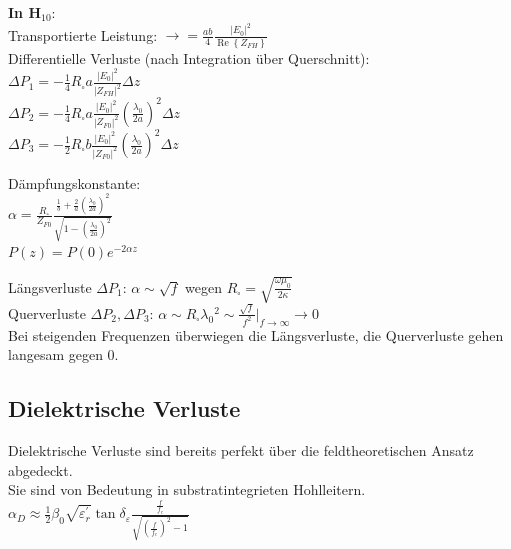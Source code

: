 \documentclass[english]{latex4ei/latex4ei_sheet}
\begin{document}
\begin{sectionbox}
	\textbf{In H$_{10}$}:\\
	Transportierte Leistung: $\rightarrow = \frac{a b}{4} \frac{\left|E_{0}\right|^{2}}{\operatorname{Re}\left\{Z_{F H}\right\}}$\\
	Differentielle Verluste (nach Integration über Querschnitt):\\
	$\Delta P_{1}=-\frac{1}{4} R_{\square} a \frac{\left|E_{0}\right|^{2}}{\left|Z_{F H}\right|^{2}} \Delta z$\\
	$\Delta P_{2}=-\frac{1}{4} R_{\square} a \frac{\left|E_{0}\right|^{2}}{\left|Z_{F 0}\right|^{2}}\left(\frac{\lambda_{0}}{2 a}\right)^{2} \Delta z$ \\
	$\Delta P_{3}=-\frac{1}{2} R_{\square} b \frac{\left|E_{0}\right|^{2}}{\left|Z_{F 0}\right|^{2}}\left(\frac{\lambda_{0}}{2 a}\right)^{2} \Delta z$\\
	\begin{emphbox}
		Dämpfungskonstante:\\
		$\alpha=\frac{R_{\square}}{Z_{F 0}} \frac{\frac{1}{b}+\frac{2}{a}\left(\frac{\lambda_{0}}{2 a}\right)^{2}}{\sqrt{1-\left(\frac{\lambda_{0}}{2 a}\right)^{2}}}$\\ 
		$P(z) = P(0) e^{-2\alpha z}$ 
	\end{emphbox}

	Längsverluste $\Delta P_{1}$: $\alpha \sim \sqrt{f}$ wegen $R_{\square}=\sqrt{\frac{\omega \mu_{0}}{2 \kappa}}$\\ 
	Querverluste $\Delta P_{2}, \Delta P_{3}$: $\alpha \sim R_{\square} \lambda_{0}{ }^{2} \sim \frac{\sqrt{f}}{f^{2}}|_{f \rightarrow \infty} \rightarrow 0$\\ 
	Bei steigenden Frequenzen überwiegen die Längsverluste, die Querverluste gehen langesam gegen 0.

\end{sectionbox}

\begin{sectionbox}
	\subsection{Dielektrische Verluste}
	Dielektrische Verluste sind bereits perfekt über die feldtheoretischen Ansatz abgedeckt.\\
	Sie sind von Bedeutung in substratintegrieten Hohlleitern.\\
	$\alpha_{D} \approx \frac{1}{2} \beta_{0} \sqrt{\varepsilon_{r}^{\prime}} \tan \delta_{\varepsilon} \frac{\frac{f}{f_{c}}}{\sqrt{\left(\frac{f}{f_{c}}\right)^{2}-1}}$\\
\end{sectionbox}
\end{document}
